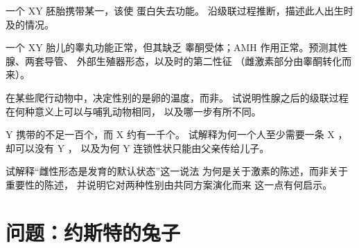 \begin{exercise}[$\star\star$]\label{exo:g11:becoming-male-female:11}
一个 XY 胚胎携带某一，该使  蛋白失去功能。
沿级联过程推断，描述此人出生时及的情况。
\end{exercise}

\begin{exercise}[$\star\star\star$]\label{exo:g11:becoming-male-female:12}
一个 XY 胎儿的睾丸功能正常，但其缺乏
睾酮受体；AMH 作用正常。预测其性腺、两套导管、
外部生殖器形态，以及时的第二性征
（雌激素部分由睾酮转化而来）。
\end{exercise}

\begin{exercise}[$\star\star\star$]\label{exo:g11:becoming-male-female:13}
在某些爬行动物中，决定性别的是卵的温度，而非。
试说明性腺之后的级联过程在何种意义上可以与哺乳动物相同，
以及哪一步有所不同。
\end{exercise}

\begin{exercise}[$\star\star\star$]\label{exo:g11:becoming-male-female:14}
Y 携带的不足一百个，而 X 约有一千个。
试解释为何一个人至少需要一条 X ，却可以没有 Y ，
以及为何 Y 连锁性状只能由父亲传给儿子。
\end{exercise}

\begin{exercise}[$\star\star\star$]\label{exo:g11:becoming-male-female:15}
试解释“雌性形态是发育的默认状态”这一说法
为何是关于激素的陈述，而非关于重要性的陈述，
并说明它对两种性别由共同方案演化而来
这一点有何启示。
\end{exercise}

\section{问题：约斯特的兔子}

